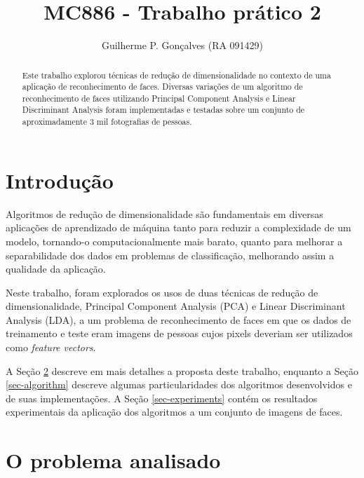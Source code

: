\documentclass[10pt,twocolumn,letterpaper]{article}
\begin{document}
\title{MC886 - Trabalho prático 2}
\author{Guilherme P. Gonçalves (RA 091429)}

\maketitle
\begin{abstract}
Este trabalho explorou técnicas de redução de dimensionalidade no contexto de uma aplicação de reconhecimento de faces. Diversas variações de um algoritmo de reconhecimento de faces utilizando Principal Component Analysis e Linear Discriminant Analysis foram implementadas e testadas sobre um conjunto de aproximadamente 3 mil fotografias de pessoas.
\end{abstract}

\section{Introdução}

Algoritmos de redução de dimensionalidade são fundamentais em diversas aplicações de aprendizado de máquina tanto para reduzir a complexidade de um modelo, tornando-o computacionalmente mais barato, quanto para melhorar a separabilidade dos dados em problemas de classificação, melhorando assim a qualidade da aplicação.

Neste trabalho, foram explorados os usos de duas técnicas de redução de dimensionalidade, Principal Component Analysis (PCA) e Linear Discriminant Analysis (LDA), a um problema de reconhecimento de faces em que os dados de treinamento e teste eram imagens de pessoas cujos pixels deveriam ser utilizados como \emph{feature vectors}.

A Seção \ref{sec-problem} descreve em mais detalhes a proposta deste trabalho, enquanto a Seção \ref{sec-algorithm} descreve algumas particularidades dos algoritmos desenvolvidos e de suas implementações. A Seção \ref{sec-experiments} contém os resultados experimentais da aplicação dos algoritmos a um conjunto de imagens de faces.

\section{O problema analisado}
\label{sec-problem}
\end{document}
